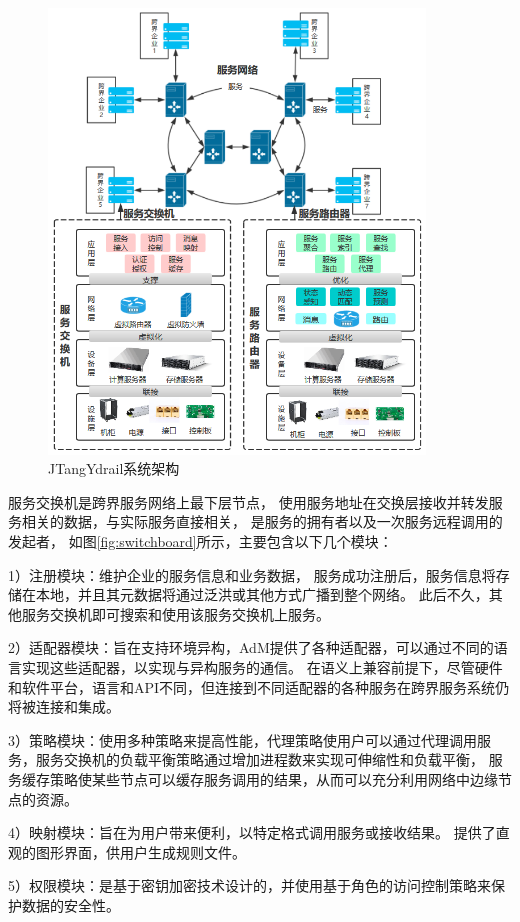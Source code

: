   \begin{figure}[htbp]
    \centering
    \includegraphics[width=10cm]{./images/system.png}
    \caption{JTangYdrail系统架构\cite{zhanghuan}}
    \label{fig:system}
  \end{figure}

  服务交换机是跨界服务网络上最下层节点，
  使用服务地址在交换层接收并转发服务相关的数据，与实际服务直接相关，
  是服务的拥有者以及一次服务远程调用的发起者，
如图\ref{fig:switchboard}所示，主要包含以下几个模块：

1）注册模块：维护企业的服务信息和业务数据，
服务成功注册后，服务信息将存储在本地，并且其元数据将通过泛洪或其他方式广播到整个网络。
此后不久，其他服务交换机即可搜索和使用该服务交换机上服务。

2）适配器模块：旨在支持环境异构，AdM提供了各种适配器，可以通过不同的语言实现这些适配器，以实现与异构服务的通信。
在语义上兼容前提下，尽管硬件和软件平台，语言和API不同，但连接到不同适配器的各种服务在跨界服务系统仍将被连接和集成。

3）策略模块：使用多种策略来提高性能，代理策略使用户可以通过代理调用服务，服务交换机的负载平衡策略通过增加进程数来实现可伸缩性和负载平衡，
服务缓存策略使某些节点可以缓存服务调用的结果，从而可以充分利用网络中边缘节点的资源。 

4）映射模块：旨在为用户带来便利，以特定格式调用服务或接收结果。
 提供了直观的图形界面，供用户生成规则文件。 
 
5）权限模块：是基于密钥加密技术设计的，并使用基于角色的访问控制策略来保护数据的安全性。

